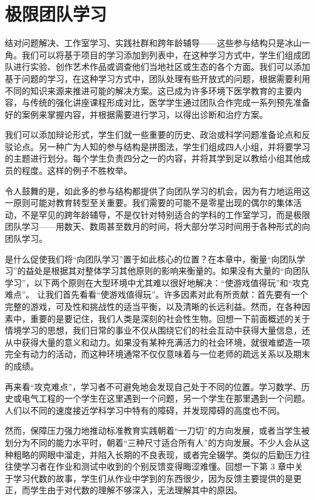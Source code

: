 \section*{极限团队学习}

结对问题解决、工作室学习、实践社群和跨年龄辅导——这些参与结构只是冰山一角。我们可以将基于项目的学习添加到列表中，在这种学习方式中，学生们组成团队进行实验、创作艺术作品或调查他们当地社区或生态的各个方面。我们可以添加基于问题的学习，在这种学习方式中，团队处理有些开放式的问题，根据需要利用不同的知识来源来推进可能的解决方案。这已成为许多环境下医学教育的主要内容，与传统的强化讲座课程形成对比，医学学生通过团队合作完成一系列预先准备好的案例来掌握内容，并根据需要进行学习，以得出诊断和治疗方案。

我们可以添加辩论形式，学生们就一些重要的历史、政治或科学问题准备论点和反驳论点。另一种广为人知的参与结构是拼图法，学生们组成四人小组，并将要学习的主题进行划分。每个学生负责四分之一的内容，并将其学到足以教给小组其他成员的程度。这样的例子不胜枚举。

令人鼓舞的是，如此多的参与结构都提供了向团队学习的机会，因为有力地运用这一原则可能对教育转型至关重要。我们需要的可能不是零星出现的偶尔的集体活动，不是罕见的跨年龄辅导，不是仅针对特别适合的学科的工作室学习，而是极限团队学习——用数天、数周甚至数月的时间，将大部分学习时间用于各种形式的向团队学习。

是什么促使我们将“向团队学习”置于如此核心的位置？在本章中，衡量“向团队学习”的益处是根据其对整体学习其他原则的影响来衡量的。如果没有大量的“向团队学习”，以下两个原则在大型环境中尤其难以很好地解决：“使游戏值得玩”和“攻克难点”。
让我们首先看看“使游戏值得玩”。许多因素对此有所贡献：首先要有一个完整的游戏，可及性和挑战性的适当平衡，以及清晰的长远利益。然而，在各种因素中，重要的是要记住，我们人类是深刻的社会性生物。回想一下前面概述的关于情境学习的思想，我们日常的事业不仅从围绕它们的社会互动中获得大量信息，还从中获得大量的意义和动力。如果没有某种充满活力的社会环境，就很难塑造一项完全有动力的活动，而这种环境通常不仅仅意味着与一位老师的疏远关系以及期末的成绩。

再来看“攻克难点”，学习者不可避免地会发现自己处于不同的位置。学习数学、历史或电气工程的一个学生在这里遇到一个问题，另一个学生在那里遇到一个问题。人们以不同的速度接近学科学习中特有的障碍，并发现障碍的高度也不同。

然而，保障压力强力地推动标准教育实践朝着“一刀切”的方向发展，或者当学生被划分为不同的能力水平时，朝着“三种尺寸适合所有人”的方向发展。不少人会从这种粗略的网眼中溜走，并陷入长期的不良表现，或者完全辍学。类似的后勤压力往往使学习者在作业和测试中收到的个别反馈变得晦涩难懂。回想一下第 3 章中关于学习代数的故事，学生们从作业中学到的东西很少，因为反馈主要提供的是更正，而学生由于对代数的理解不够深入，无法理解其中的原因。

